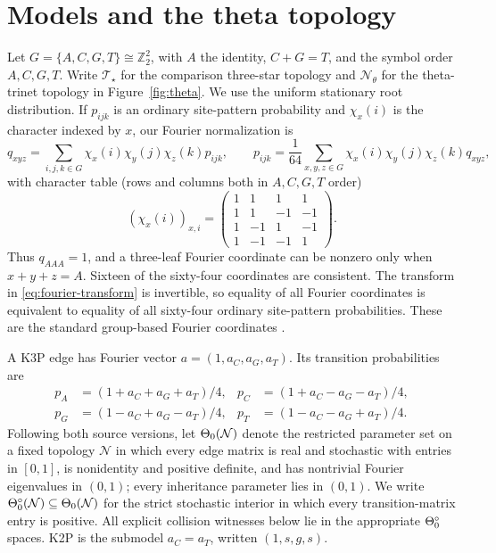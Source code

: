 \documentclass[11pt]{article}
\theoremstyle{remark}\newtheorem{remark}[theorem]{Remark}
\newcommand{\Tstar}{\mathcal T_\star}\newcommand{\Ntheta}{\mathcal N_\theta}
\begin{document}
\section{Models and the theta topology}\label{sec:models}
Let $G=\{A,C,G,T\}\cong\mathbb Z_2^2$, with $A$ the identity, $C+G=T$, and the symbol order $A,C,G,T$. Write $\Tstar$ for the comparison three-star topology and $\Ntheta$ for the theta-trinet topology in Figure~\ref{fig:theta}. We use the uniform stationary root distribution. If $p_{ijk}$ is an ordinary site-pattern probability and $\chi_x(i)$ is the character indexed by $x$, our Fourier normalization is
\begin{equation}\label{eq:fourier-transform}
q_{xyz}=\sum_{i,j,k\in G}\chi_x(i)\chi_y(j)\chi_z(k)p_{ijk},\qquad
p_{ijk}=\frac1{64}\sum_{x,y,z\in G}\chi_x(i)\chi_y(j)\chi_z(k)q_{xyz},
\end{equation}
with character table (rows and columns both in $A,C,G,T$ order)
\[
(\chi_x(i))_{x,i}=\begin{pmatrix}
1&1&1&1\\ 1&1&-1&-1\\ 1&-1&1&-1\\ 1&-1&-1&1
\end{pmatrix}.
\]
Thus $q_{AAA}=1$, and a three-leaf Fourier coordinate can be nonzero only when $x+y+z=A$. Sixteen of the sixty-four coordinates are consistent. The transform in \eqref{eq:fourier-transform} is invertible, so equality of all Fourier coordinates is equivalent to equality of all sixty-four ordinary site-pattern probabilities. These are the standard group-based Fourier coordinates \cite{EvansSpeed1993,SturmfelsSullivant2005}.

A K3P edge has Fourier vector $a=(1,a_C,a_G,a_T)$. Its transition probabilities are
\begin{align*}
p_A&=(1+a_C+a_G+a_T)/4,&p_C&=(1+a_C-a_G-a_T)/4,\\
p_G&=(1-a_C+a_G-a_T)/4,&p_T&=(1-a_C-a_G+a_T)/4.
\end{align*}
Following both source versions, let $\Theta_0(\mathcal N)$ denote the restricted parameter set on a fixed topology $\mathcal N$ in which every edge matrix is real and stochastic with entries in $[0,1]$, is nonidentity and positive definite, and has nontrivial Fourier eigenvalues in $(0,1)$; every inheritance parameter lies in $(0,1)$. We write $\Theta_0^\circ(\mathcal N)\subseteq\Theta_0(\mathcal N)$ for the strict stochastic interior in which every transition-matrix entry is positive. All explicit collision witnesses below lie in the appropriate $\Theta_0^\circ$ spaces. K2P is the submodel $a_C=a_T$, written $(1,s,g,s)$.
\end{document}
